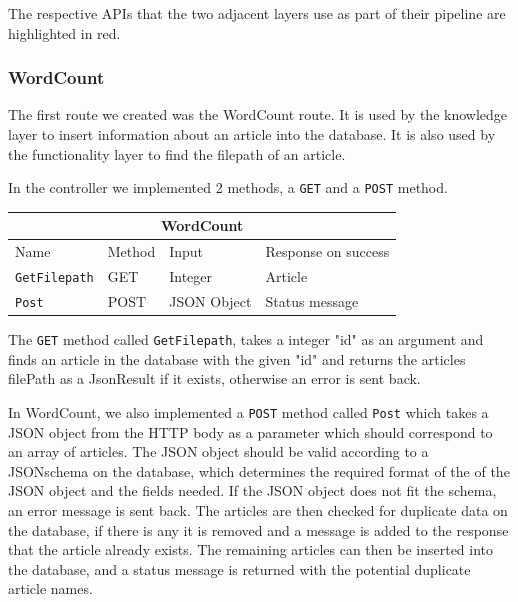 The respective APIs that the two adjacent layers use as part of their pipeline are highlighted in red. 

\subsubsection{WordCount}

The first route we created was the WordCount route. It is used by the knowledge layer to insert information about an article into the database. It is also used by the functionality layer to find the filepath of an article.

In the controller we implemented 2 methods, a \texttt{GET} and a \texttt{POST} method.
\begin{table}[h]
    \begin{tabular}{|llll|}
    \hline
    \multicolumn{4}{|c|}{\textbf{WordCount}}                                                                                 \\ \hline
    \multicolumn{1}{|l|}{Name}                 & \multicolumn{1}{l|}{Method} & \multicolumn{1}{l|}{Input}       & Response on success       \\ \hline
    \multicolumn{1}{|l|}{\texttt{GetFilepath}} & \multicolumn{1}{l|}{GET}    & \multicolumn{1}{l|}{Integer}     & Article        \\ \hline
    \multicolumn{1}{|l|}{\texttt{Post}}        & \multicolumn{1}{l|}{POST}   & \multicolumn{1}{l|}{JSON Object} & Status message \\ \hline
    \end{tabular}
    \end{table}

The \texttt{GET} method called \texttt{GetFilepath}, takes a integer "id" as an argument and finds an article in the database with the given "id" and returns the articles filePath as a JsonResult if it exists, otherwise an error is sent back.


In WordCount, we also implemented a \texttt{POST} method called \texttt{Post} which takes a JSON object from the HTTP body as a parameter which should correspond to an array of articles. 
The JSON object should be valid according to a JSONschema on the database, which determines the required format of the of the JSON object and the fields needed. If the JSON object does not fit the schema, an error message is sent back. 
The articles are then checked for duplicate data on the database, if there is any it is removed and a message is added to the response that the article already exists. The remaining articles can then be inserted into the database, and a status message is returned with the potential duplicate article names. 
 
